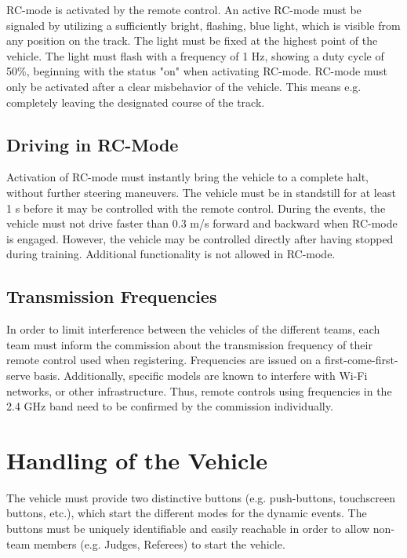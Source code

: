 RC-mode is activated by the remote control. An active RC-mode must be signaled
by utilizing a sufficiently bright, flashing, blue light, which is visible from
any position on the track. The light must be fixed at the highest point of the
vehicle. The light must flash with a frequency of 1 Hz, showing a duty cycle of
50\%, beginning with the status "on" when activating RC-mode. RC-mode must only
be activated after a clear misbehavior of the vehicle. This means e.g.
completely leaving the designated course of the track.

\subsection{Driving in RC-Mode}

Activation of RC-mode must instantly bring the vehicle to a complete halt,
without further steering maneuvers. The vehicle must be in standstill for at
least 1 s before it may be controlled with the remote control. During the
events, the vehicle must not drive faster than 0.3 m/s forward and backward
when RC-mode is engaged. However, the vehicle may be controlled directly after
having stopped during training. Additional functionality is not allowed in
RC-mode.

\subsection{Transmission Frequencies}

In order to limit interference between the vehicles of the different teams,
each team must inform the commission about the transmission frequency of their
remote control used when registering. Frequencies are issued on a
first-come-first-serve basis. Additionally, specific models are known to
interfere with Wi-Fi networks, or other infrastructure. Thus, remote controls
using frequencies in the 2.4 GHz band need to be confirmed by the commission
individually.

\section{Handling of the Vehicle}

The vehicle must provide two distinctive buttons (e.g. push-buttons,
touchscreen buttons, etc.), which start the different modes for the dynamic
events. The buttons must be uniquely identifiable and easily reachable in order
to allow non-team members (e.g. Judges, Referees) to start the vehicle.

